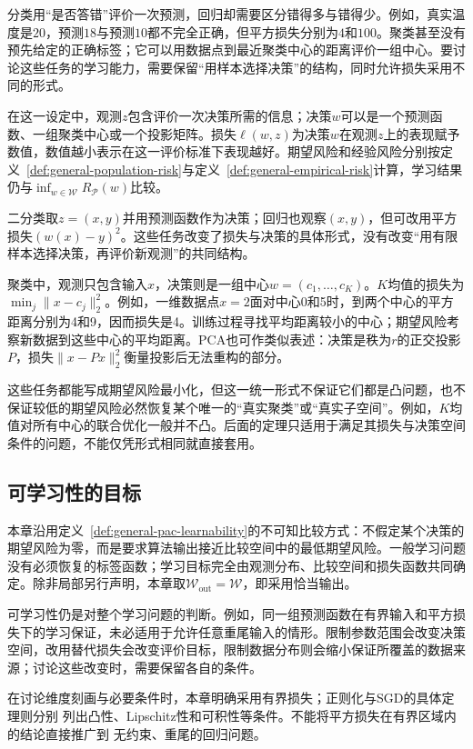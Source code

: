 分类用“是否答错”评价一次预测，回归却需要区分错得多与错得少。例如，真实温度是$20$，预测$18$与预测$10$都不完全正确，但平方损失分别为$4$和$100$。聚类甚至没有预先给定的正确标签；它可以用数据点到最近聚类中心的距离评价一组中心。要讨论这些任务的学习能力，需要保留“用样本选择决策”的结构，同时允许损失采用不同的形式。

在这一设定中，观测$z$包含评价一次决策所需的信息；决策$w$可以是一个预测函数、一组聚类中心或一个投影矩阵。损失$\ell(w,z)$为决策$w$在观测$z$上的表现赋予数值，数值越小表示在这一评价标准下表现越好。期望风险和经验风险分别按定义~\ref{def:general-population-risk}与定义~\ref{def:general-empirical-risk}计算，学习结果仍与$\inf_{w\in\mathcal W}R_{\mathcal P}(w)$比较。

二分类取$z=(x,y)$并用预测函数作为决策；回归也观察$(x,y)$，但可改用平方损失$(w(x)-y)^2$。这些任务改变了损失与决策的具体形式，没有改变“用有限样本选择决策，再评价新观测”的共同结构。

聚类中，观测只包含输入$x$，决策则是一组中心$w=(c_1,\ldots,c_K)$。$K$均值的损失为$\min_j\|x-c_j\|_2^2$。例如，一维数据点$x=2$面对中心0和5时，到两个中心的平方距离分别为4和9，因而损失是4。训练过程寻找平均距离较小的中心；期望风险考察新数据到这些中心的平均距离。PCA也可作类似表述：决策是秩为$r$的正交投影$P$，损失$\|x-Px\|_2^2$衡量投影后无法重构的部分。

这些任务都能写成期望风险最小化，但这一统一形式不保证它们都是凸问题，也不保证较低的期望风险必然恢复某个唯一的“真实聚类”或“真实子空间”。例如，$K$均值对所有中心的联合优化一般并不凸。后面的定理只适用于满足其损失与决策空间条件的问题，不能仅凭形式相同就直接套用。

\subsection{可学习性的目标}

本章沿用定义~\ref{def:general-pac-learnability}的不可知比较方式：不假定某个决策的期望风险为零，而是要求算法输出接近比较空间中的最低期望风险。一般学习问题没有必须恢复的标签函数；学习目标完全由观测分布、比较空间和损失函数共同确定。除非局部另行声明，本章取$\mathcal W_{\mathrm{out}}=\mathcal W$，即采用恰当输出。

可学习性仍是对整个学习问题的判断。例如，同一组预测函数在有界输入和平方损失下的学习保证，未必适用于允许任意重尾输入的情形。限制参数范围会改变决策空间，改用替代损失会改变评价目标，限制数据分布则会缩小保证所覆盖的数据来源；讨论这些改变时，需要保留各自的条件。

在讨论维度刻画与必要条件时，本章明确采用有界损失；正则化与SGD的具体定理则分别
列出凸性、Lipschitz性和可积性等条件。不能将平方损失在有界区域内的结论直接推广到
无约束、重尾的回归问题。

